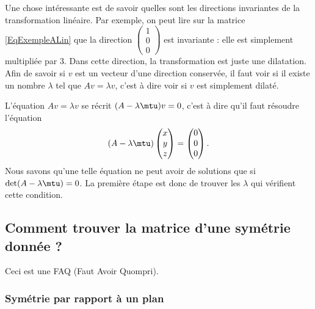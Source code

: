 Une chose intéressante est de savoir quelles sont les directions invariantes de la transformation linéaire. Par exemple, on peut lire sur la matrice \eqref{EqExempleALin} que la direction $\begin{pmatrix}
	1	\\ 
	0	\\ 
	0	
\end{pmatrix}$ est invariante : elle est simplement multipliée par $3$. Dans cette direction, la transformation est juste une dilatation. Afin de savoir si $v$ est un vecteur d'une direction conservée, il faut voir si il existe un nombre $\lambda$ tel que $Av=\lambda v$, c'est à dire voir si $v$ est simplement dilaté.

L'équation $Av=\lambda v$ se récrit $(A-\lambda\mtu)v=0$, c'est à dire qu'il faut résoudre l'équation
\begin{equation}
	(A-\lambda\mtu)\begin{pmatrix}
		x	\\ 
		y	\\ 
		z	
	\end{pmatrix}=
	\begin{pmatrix}
		0	\\ 
		0	\\ 
		0	
	\end{pmatrix}.
\end{equation}
Nous savons qu'une telle équation ne peut avoir de solutions que si $\det(A-\lambda\mtu)=0$. La première étape est donc de trouver les $\lambda$ qui vérifient cette condition.


\subsection{Comment trouver la matrice d'une symétrie donnée ?}
\label{SubSecMtrSym}

Ceci est une FAQ (Faut Avoir Quompri). 

\subsubsection{Symétrie par rapport à un plan}

